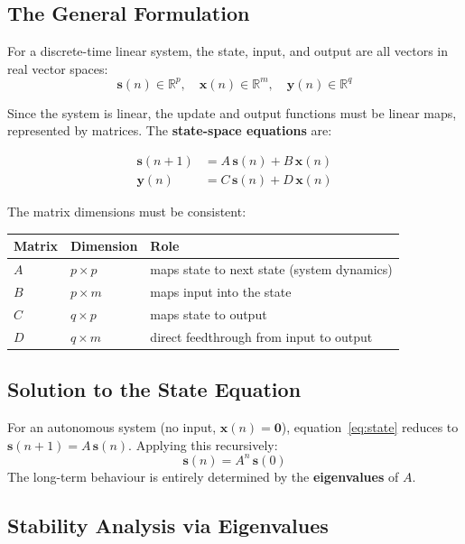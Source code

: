 \documentclass[11pt]{article}
\begin{document}
\subsection{The General Formulation}

For a discrete-time linear system, the state, input, and output are all vectors in real vector spaces:
\[
  \mathbf{s}(n) \in \mathbb{R}^p, \quad \mathbf{x}(n) \in \mathbb{R}^m, \quad \mathbf{y}(n) \in \mathbb{R}^q
\]

Since the system is linear, the update and output functions must be linear maps, represented by matrices. The \textbf{state-space equations} are:

\begin{align}
  \mathbf{s}(n+1) &= A\,\mathbf{s}(n) + B\,\mathbf{x}(n) \label{eq:state} \\
  \mathbf{y}(n)   &= C\,\mathbf{s}(n) + D\,\mathbf{x}(n) \label{eq:output}
\end{align}

The matrix dimensions must be consistent:

\begin{center}
\begin{tabular}{@{}lll@{}}
\toprule
Matrix & Dimension & Role \\
\midrule
$A$ & $p \times p$ & maps state to next state (system dynamics) \\
$B$ & $p \times m$ & maps input into the state \\
$C$ & $q \times p$ & maps state to output \\
$D$ & $q \times m$ & direct feedthrough from input to output \\
\bottomrule
\end{tabular}
\end{center}

\subsection{Solution to the State Equation}

For an autonomous system (no input, $\mathbf{x}(n) = \mathbf{0}$), equation~\eqref{eq:state} reduces to $\mathbf{s}(n+1) = A\,\mathbf{s}(n)$. Applying this recursively:
\[
  \mathbf{s}(n) = A^n\,\mathbf{s}(0)
\]
The long-term behaviour is entirely determined by the \textbf{eigenvalues} of $A$.

\subsection{Stability Analysis via Eigenvalues}
\end{document}
